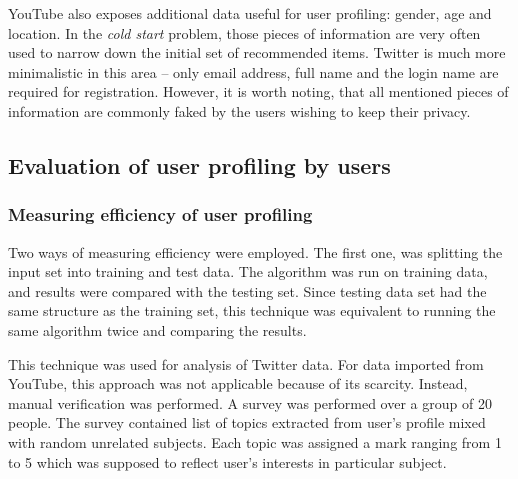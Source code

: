 YouTube also exposes additional data useful for user profiling: gender, age and
location. In the \textit{cold start} problem, those pieces of information are very
often used to narrow down the initial set of recommended items. Twitter is much
more minimalistic in this area -- only email address, full name and the login
name are required for registration. However, it is worth noting, that all
mentioned pieces of information are commonly faked by the users wishing to keep
their privacy.

\subsection{Evaluation of user profiling by users}
\subsubsection{Measuring efficiency of user profiling}

Two ways of measuring efficiency were employed. The first one, was splitting the
input set into training and test data. The algorithm was run on training data,
and results were compared with the testing set. Since testing data set had the
same structure as the training set, this technique was equivalent to running the
same algorithm twice and comparing the results.

This technique was used for analysis of Twitter data. For data imported from
YouTube, this approach was not applicable because of its scarcity. Instead,
manual verification was performed. A survey was performed over a group of 20
people. The survey contained list of topics extracted from user's profile mixed
with random unrelated subjects. Each topic was assigned a mark ranging from 1 to
5 which was supposed to reflect user's interests in particular subject.
